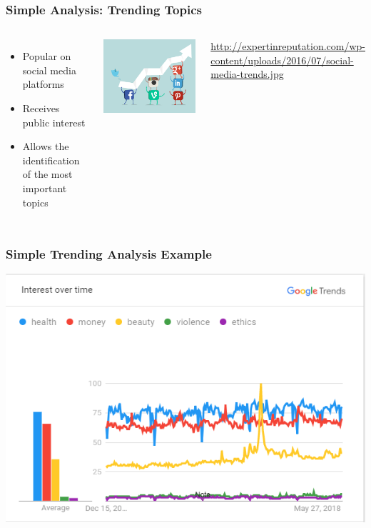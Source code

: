 \documentclass[xcolor=table]{beamer}
\begin{document}
\begin{frame}
\frametitle{Simple Analysis: Trending Topics}
\begin{columns}
           \begin{itemize}
    \item Popular on social media platforms
    \item Receives public interest
    \item Allows the identification of the most important topics
    \end{itemize}
        \centering
        \includegraphics[scale=0.4]{img0003.png}
        
        {\tiny \url{http://expertinreputation.com/wp-content/uploads/2016/07/social-media-trends.jpg}} 
\end{columns}



\end{frame}


\begin{frame}
\frametitle{Simple Trending Analysis Example }

\includegraphics[scale=0.75]{trends2}
\end{frame}
\end{document}
